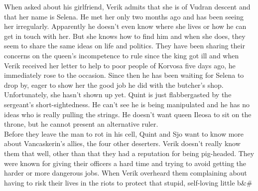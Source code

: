 When asked about his girlfriend, Verik admits that she is of Vudran descent and that her name is Selena. He met her only two months ago and has been seeing her irregularly. Apparently he doesn't even know where she lives or how he can get in touch with her. But she knows how to find him and when she does, they seem to share the same ideas on life and politics. They have been sharing their concerns on the queen's incompetence to rule since the king got ill and when Verik received her letter to help to poor people of Korvosa five days ago, he immediately rose to the occasion. Since then he has been waiting for Selena to drop by, eager to show her the good job he did with the butcher's shop. Unfortunately, she hasn't shown up yet. Quint is just flabbergasted by the sergeant's short-sightedness. He can't see he is being manipulated and he has no ideas who is really pulling the strings. He doesn't want queen Ileosa to sit on the throne, but he cannot present an alternative ruler.\\

Before they leave the man to rot in his cell, Quint and Sjo want to know more about Vancaskerin's allies, the four other deserters. Verik doesn't really know them that well, other than that they had a reputation for being pig-headed. They were known for giving their officers a hard time and trying to avoid getting the harder or more dangerous jobs. When Verik overheard them complaining about having to risk their lives in the riots to protect that stupid, self-loving little b\&\#\\

